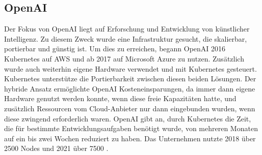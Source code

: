 \documentclass[11pt,a4paper]{article}
\begin{document}
\subsection{OpenAI}
Der Fokus von OpenAI liegt auf Erforschung und Entwicklung von künstlicher Intelligenz.
Zu diesem Zweck wurde eine Infrastruktur gesucht, die skalierbar, portierbar und günstig ist.
Um dies zu erreichen, begann OpenAI 2016 Kubernetes auf AWS und ab 2017 auf
Microsoft Azure zu nutzen. Zusätzlich wurde auch weiterhin eigene Hardware verwendet
und mit Kubernetes gesteuert.
Kubernetes unterstütze die Portierbarkeit zwischen diesen beiden Lösungen.
Der hybride Ansatz ermöglichte OpenAI Kosteneinsparungen,
da immer dann eigene Hardware genutzt werden konnte, wenn diese freie Kapazitäten hatte,
und zusätzlich Ressourcen vom Cloud-Anbieter nur dann eingebunden wurden,
wenn diese zwingend erforderlich waren.
OpenAI gibt an, durch Kubernetes die Zeit, die für bestimmte Entwicklungsaufgaben
benötigt wurde, von mehreren Monaten auf ein bis zwei Wochen reduziert zu haben.
Das Unternehmen nutzte 2018 über 2500 Nodes \cite{openai_scaling_2500} und 2021 über 7500 \cite{openai_scaling_7500} \cite{story_openai}.



\end{document}

